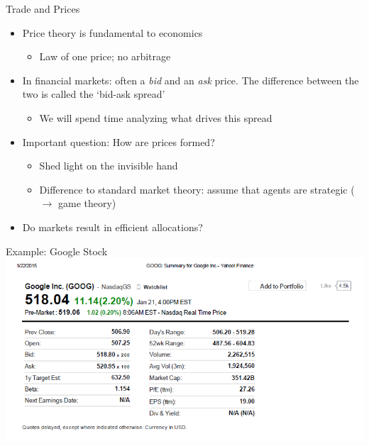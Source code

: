 \documentclass[english,10pt]{beamer}
\theoremstyle{definition}
\begin{document}
\begin{frame}[label=main2]{Trade and Prices}
\begin{itemize}
	\item Price theory is fundamental to economics
	\begin{itemize}
		\item Law of one price; no arbitrage
	\end{itemize}
	\item In financial markets: often a \textit{bid} and an \textit{ask} price. The difference between the two is called the `bid-ask spread' \hyperlink{bidask}{}
	\begin{itemize}
		\item We will spend time analyzing what drives this spread
	\end{itemize}
	\item Important question: How are prices formed?
	\begin{itemize}
		\item Shed light on the invisible hand
		\item Difference to standard market theory: assume that agents are strategic ($\rightarrow$ game theory) 
	\end{itemize}
	\item Do markets result in efficient allocations?
\end{itemize}
\end{frame}


\begin{frame}{Example: Google Stock}
\includegraphics[width=1\linewidth]{pics/StockSummary_Google}
\end{frame}
\end{document}

